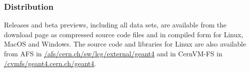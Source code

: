 
\subsubsection{Distribution}
Releases and beta previews, including all data sets, are available from the
\Gfour{} download page \cite{QA:G4down} as compressed source code files and in
compiled form for Linux, MacOS and Windows.  The source code and libraries for
Linux are also available from AFS in \url{/afs/cern.ch/sw/lcg/external/geant4} 
and in CernVM-FS in \url{/cvmfs/geant4.cern.ch/geant4}.
